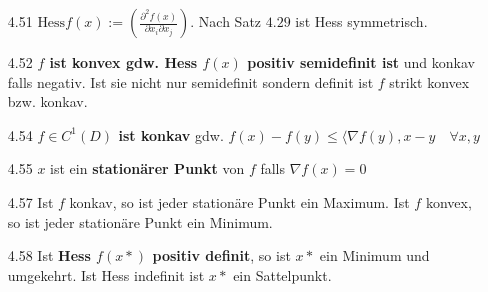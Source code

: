 \documentclass{scrartcl}
\begin{document}
\begin{itemize}
    \item [4.51]
    $\text{Hess} f(x) := \left( \frac{\partial^2 f(x)}{\partial x_i \partial x_j}\right)$. Nach Satz $4.29$ ist Hess symmetrisch.

    \item [4.52] \textbf{$f$ ist konvex gdw. Hess $f(x)$ positiv semidefinit ist} und konkav falls negativ. Ist sie nicht nur semidefinit sondern definit ist $f$ strikt konvex bzw. konkav.

    \item [4.54] \textbf{$f \in C^1(D)$ ist konkav} gdw. $f(x) - f(y) \leq \langle \nabla f(y),x-y\quad\forall x,y$

    \item [4.55] $x$ ist ein \textbf{stationärer Punkt} von $f$ falls $\nabla f(x) = 0$

    \item [4.57] Ist $f$ konkav, so ist jeder stationäre Punkt ein Maximum. Ist $f$ konvex, so ist jeder stationäre Punkt ein Minimum.

    \item [4.58] Ist \textbf{Hess $f(x*)$ positiv definit}, so ist $x*$ ein Minimum und umgekehrt. Ist Hess indefinit ist $x*$ ein Sattelpunkt.
\end{itemize}
\end{document}
